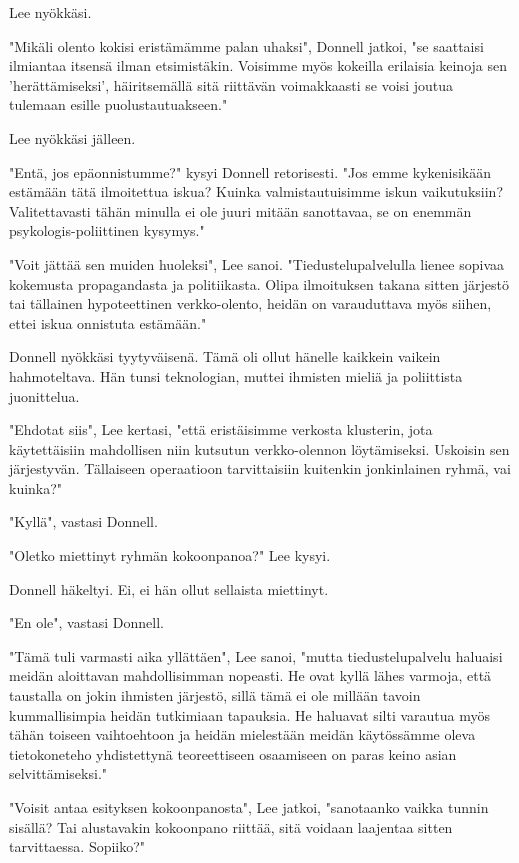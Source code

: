 Lee nyökkäsi.


"Mikäli olento kokisi eristämämme palan uhaksi", Donnell jatkoi, "se saattaisi ilmiantaa itsensä ilman etsimistäkin. Voisimme myös kokeilla erilaisia keinoja sen 'herättämiseksi', häiritsemällä sitä riittävän voimakkaasti se voisi joutua tulemaan esille puolustautuakseen."


Lee nyökkäsi jälleen.


"Entä, jos epäonnistumme?" kysyi Donnell retorisesti. "Jos emme kykenisikään estämään tätä ilmoitettua iskua? Kuinka valmistautuisimme iskun vaikutuksiin? Valitettavasti tähän minulla ei ole juuri mitään sanottavaa, se on enemmän psykologis-poliittinen kysymys."


"Voit jättää sen muiden huoleksi", Lee sanoi. "Tiedustelupalvelulla lienee sopivaa kokemusta propagandasta ja politiikasta. Olipa ilmoituksen takana sitten järjestö tai tällainen hypoteettinen verkko-olento, heidän on varauduttava myös siihen, ettei iskua onnistuta estämään."


Donnell nyökkäsi tyytyväisenä. Tämä oli ollut hänelle kaikkein vaikein hahmoteltava. Hän tunsi teknologian, muttei ihmisten mieliä ja poliittista juonittelua.


"Ehdotat siis", Lee kertasi, "että eristäisimme verkosta klusterin, jota käytettäisiin mahdollisen niin kutsutun verkko-olennon löytämiseksi. Uskoisin sen järjestyvän. Tällaiseen operaatioon tarvittaisiin kuitenkin jonkinlainen ryhmä, vai kuinka?"


"Kyllä", vastasi Donnell.


"Oletko miettinyt ryhmän kokoonpanoa?" Lee kysyi.


Donnell häkeltyi. Ei, ei hän ollut sellaista miettinyt.


"En ole", vastasi Donnell.


"Tämä tuli varmasti aika yllättäen", Lee sanoi, "mutta tiedustelupalvelu haluaisi meidän aloittavan mahdollisimman nopeasti. He ovat kyllä lähes varmoja, että taustalla on jokin ihmisten järjestö, sillä tämä ei ole millään tavoin kummallisimpia heidän tutkimiaan tapauksia. He haluavat silti varautua myös tähän toiseen vaihtoehtoon ja heidän mielestään meidän käytössämme oleva tietokoneteho yhdistettynä teoreettiseen osaamiseen on paras keino asian selvittämiseksi."


"Voisit antaa esityksen kokoonpanosta", Lee jatkoi, "sanotaanko vaikka tunnin sisällä? Tai alustavakin kokoonpano riittää, sitä voidaan laajentaa sitten tarvittaessa. Sopiiko?"


